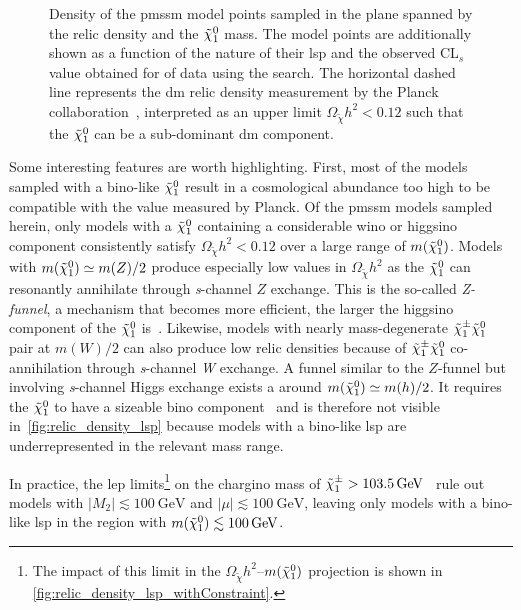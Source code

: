 \begin{figure}
\begin{subfigure}[b]{0.545\linewidth}
		\caption{\label{fig:relic_density_lsp_cls}}
	\end{subfigure}\hfill
	\caption{Density of the \gls{pmssm} model points sampled in the plane spanned by the relic density and the $\tilde{\chi}_1^0$ mass. The model points are additionally shown as a function of  the nature of their \gls{lsp} and  the observed CL$_s$ value obtained for \onethirtynineifb of data using the \onelepton search. The horizontal dashed line represents the \gls{dm} relic density measurement by the Planck collaboration~\cite{Planck}, interpreted as an upper limit $\Omega_{\tilde{\chi}} h^2 < 0.12$ such that the $\tilde{\chi}_1^0$ can be a sub-dominant \gls{dm} component.}
	\label{fig:relic_density}
\end{figure}


Some interesting features are worth highlighting. First, most of the models sampled with a bino-like $\tilde{\chi}_1^0$ result in a cosmological abundance too high to be compatible with the value measured by Planck.
Of the \gls{pmssm} models sampled herein, only models with a $\tilde{\chi}_1^0$ containing a considerable wino or higgsino component consistently satisfy $\Omega_{\tilde{\chi}} h^2 < 0.12$ over a large range of $m(\tilde{\chi}_1^0)$.
Models with $m(\tilde{\chi}_1^0) \simeq m(Z)/2$ produce especially low values in $\Omega_{\tilde{\chi}} h^2$ as the $\tilde{\chi}_1^0$ can resonantly annihilate through \textit{s}-channel $Z$ exchange. This is the so-called \textit{Z-funnel}, a mechanism that becomes more efficient, the larger the higgsino component of the $\tilde{\chi}_1^0$ is~\cite{Cabrera:2016wwr}.
Likewise, models with nearly mass-degenerate $\tilde{\chi}_1^\pm\tilde{\chi}_1^0$ pair at $m(W)/2$ can also produce low relic densities because of $\tilde{\chi}_1^\pm\tilde{\chi}_1^0$ co-annihilation through \textit{s}-channel \textit{W} exchange.
A funnel similar to the $Z$-funnel but involving \textit{s}-channel Higgs exchange exists a around $m(\tilde{\chi}_1^0) \simeq m(h)/2$. It requires the $\tilde{\chi}_1^0$ to have a sizeable bino component~\cite{Cabrera:2016wwr} and is therefore not visible in~\cref{fig:relic_density_lsp} because models with a bino-like \gls{lsp} are underrepresented in the relevant mass range.

In practice, the \gls{lep} limits\footnote{The impact of this limit in the $\Omega_{\tilde{\chi}} h^2$--$m(\tilde{\chi}_1^0)$ projection is shown in \cref{fig:relic_density_lsp_withConstraint}.} on the chargino mass of $\charg > \SI{103.5}{\GeV}$~\cite{lep_susy_results} rule out models with $\vert M_2 \vert \lesssim \SI{100}{\GeV}$ and $\vert \mu \vert \lesssim \SI{100}{\GeV}$, leaving only models with a bino-like \gls{lsp} in the region with $m(\lsp)\lesssim \SI{100}{\GeV}$.

